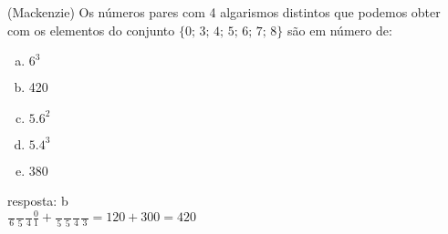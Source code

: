 \begin{ex}
(Mackenzie) Os números pares com 4 algarismos distintos que podemos obter com os elementos do conjunto $\{0;\,3;\, 4;\, 5;\, 6;\, 7;\, 8\}$ são em número de:
   \begin{enumerate}[(a)]
   \item $6^3$
   \item 420
   \item $5.6^2$
   \item $5.4^3$
   \item 380
   \end{enumerate}
    \begin{sol}
     resposta: b\\
   $\frac{\phantom{A}}{6}\frac{\phantom{A}}{5}\frac{\phantom{A}}{4}\frac{0}{1}+\frac{\phantom{A}}{5}\frac{\phantom{A}}{5}\frac{\phantom{A}}{4}\frac{\phantom{A}}{3}=120+300=420$
    \end{sol}
\end{ex}